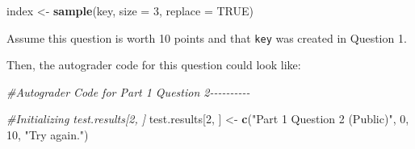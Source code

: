 \documentclass[
  12pt,
]{book}
\newenvironment{Shaded}{\begin{snugshade}}{\end{snugshade}}
\newcommand{\AttributeTok}[1]{\textcolor[rgb]{0.13,0.29,0.53}{#1}}
\newcommand{\CommentTok}[1]{\textcolor[rgb]{0.56,0.35,0.01}{\textit{#1}}}
\newcommand{\ConstantTok}[1]{\textcolor[rgb]{0.56,0.35,0.01}{#1}}
\newcommand{\DecValTok}[1]{\textcolor[rgb]{0.00,0.00,0.81}{#1}}
\newcommand{\FunctionTok}[1]{\textcolor[rgb]{0.13,0.29,0.53}{\textbf{#1}}}
\newcommand{\NormalTok}[1]{#1}
\newcommand{\OtherTok}[1]{\textcolor[rgb]{0.56,0.35,0.01}{#1}}
\newcommand{\StringTok}[1]{\textcolor[rgb]{0.31,0.60,0.02}{#1}}
\begin{document}
\begin{Shaded}
\begin{Highlighting}[]
\NormalTok{index }\OtherTok{\textless{}{-}} \FunctionTok{sample}\NormalTok{(key, }\AttributeTok{size =} \DecValTok{3}\NormalTok{, }\AttributeTok{replace =} \ConstantTok{TRUE}\NormalTok{)}
\end{Highlighting}
\end{Shaded}

Assume this question is worth 10 points and that \texttt{key} was created in Question 1.

Then, the autograder code for this question could look like:

\begin{Shaded}
\begin{Highlighting}[]
\CommentTok{\#Autograder Code for Part 1 Question 2{-}{-}{-}{-}{-}{-}{-}{-}{-}{-}}
  
\CommentTok{\#Initializing \textasciigrave{}test.results[2, ]\textasciigrave{}}
\NormalTok{test.results[}\DecValTok{2}\NormalTok{, ] }\OtherTok{\textless{}{-}} \FunctionTok{c}\NormalTok{(}\StringTok{"Part 1 Question 2 (Public)"}\NormalTok{, }\DecValTok{0}\NormalTok{, }\DecValTok{10}\NormalTok{, }\StringTok{"Try again."}\NormalTok{)}


\end{Highlighting}
\end{Shaded}
\end{document}
